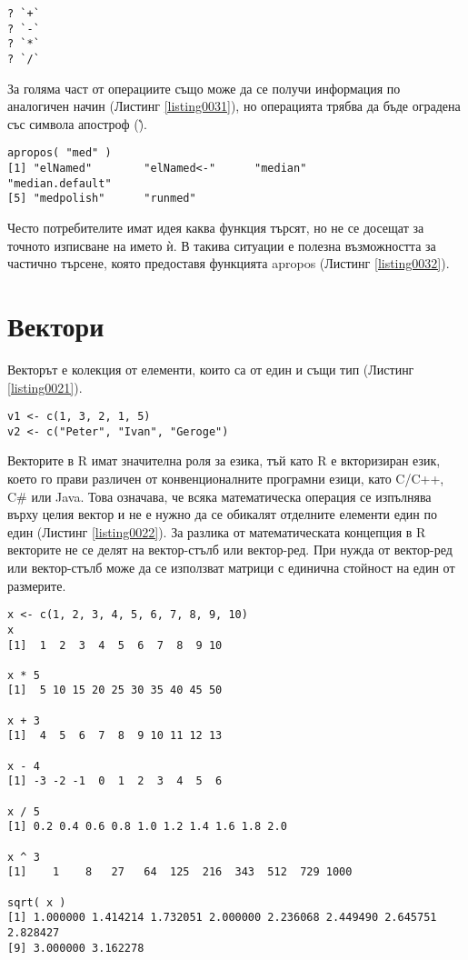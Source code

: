 \begin{lstlisting}[caption=Документация за операции, label=listing0031]
? `+`
? `-`
? `*`
? `/`
\end{lstlisting}

За голяма част от операциите също може да се получи информация по аналогичен начин (Листинг \ref{listing0031}), но операцията трябва да бъде оградена със символа апостроф (\`).

\begin{lstlisting}[caption=Частично търсене, label=listing0032]
apropos( "med" )
[1] "elNamed"        "elNamed<-"      "median"         "median.default"
[5] "medpolish"      "runmed"
\end{lstlisting}

Често потребителите имат идея каква функция търсят, но не се досещат за точното изписване на името ѝ. В такива ситуации е полезна възможността за частично търсене, която предоставя функцията apropos (Листинг \ref{listing0032}).

\section{Вектори}

Векторът е колекция от елементи, които са от един и същи тип (Листинг \ref{listing0021}). 

\begin{lstlisting}[caption=Вектори от числа и символни низове, label=listing0021]
v1 <- c(1, 3, 2, 1, 5)
v2 <- c("Peter", "Ivan", "Geroge")
\end{lstlisting}

Векторите в R имат значителна роля за езика, тъй като R е вкторизиран език, което го прави различен от конвенционалните програмни езици, като C/C++, C\# или Java. Това означава, че всяка математическа операция се изпълнява върху целия вектор и не е нужно да се обикалят отделните елементи един по един (Листинг \ref{listing0022}). За разлика от математическата концепция в R векторите не се делят на вектор-стълб или вектор-ред. При нужда от вектор-ред или вектор-стълб може да се използват матрици с единична стойност на един от размерите.

\begin{lstlisting}[caption=Базови операции над вектори, label=listing0022]
x <- c(1, 2, 3, 4, 5, 6, 7, 8, 9, 10)
x
[1]  1  2  3  4  5  6  7  8  9 10

x * 5
[1]  5 10 15 20 25 30 35 40 45 50

x + 3
[1]  4  5  6  7  8  9 10 11 12 13

x - 4
[1] -3 -2 -1  0  1  2  3  4  5  6

x / 5
[1] 0.2 0.4 0.6 0.8 1.0 1.2 1.4 1.6 1.8 2.0

x ^ 3
[1]    1    8   27   64  125  216  343  512  729 1000

sqrt( x )
[1] 1.000000 1.414214 1.732051 2.000000 2.236068 2.449490 2.645751 2.828427
[9] 3.000000 3.162278
\end{lstlisting}

